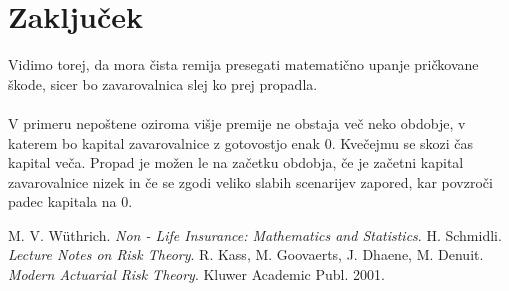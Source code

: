 \documentclass[a4paper,12pt]{homework}
\begin{document}
	\section{Zaključek}
	Vidimo torej, da mora čista remija presegati matematično upanje pričkovane škode, sicer bo zavarovalnica slej ko prej propadla. 
	\\
	\\V primeru nepoštene oziroma višje premije ne obstaja več neko obdobje, v katerem bo kapital zavarovalnice z gotovostjo enak $0$. Kvečejmu se skozi čas kapital veča. Propad je možen le na začetku obdobja, če je začetni kapital zavarovalnice nizek in če se zgodi veliko slabih scenarijev zapored, kar povzroči padec kapitala na $0$.
	\newpage
	\begin{thebibliography}{99}
		M. V. Wüthrich. \textit{Non - Life Insurance: Mathematics and Statistics}.
		H. Schmidli. \textit{Lecture Notes on Risk Theory}.
		R. Kass, M. Goovaerts, J. Dhaene, M. Denuit. \textit{Modern Actuarial Risk Theory}. Kluwer Academic Publ. 2001.
	\end{thebibliography}
	
\end{document}
